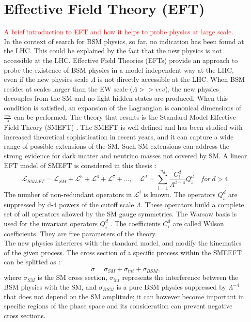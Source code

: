 \section{Effective Field Theory (EFT)}
\label{chap1:EFT}
\textcolor{red}{A brief introduction to EFT and how it helps to probe physics at large scale.\\}
In the context of search for BSM physics, so far, no indication has been found at the LHC. This could be explained by the fact that the new physics is not accessible at the LHC. Effective Field Theories (EFTs) provide an approach to probe the existence of BSM physics in a model independent way at the LHC, even if the new physics scale $\Lambda$ is not directly accessible at the LHC. When BSM resides at scales larger than the EW scale ($\Lambda >> vev$), the new physics decouples from the SM and no light hidden states are produced. When this condition is satisfied, an expansion of the Lagrangian is canonical dimensions of $\frac{vev}{\lambda}$ can be performed. The theory that results is the Standard Model Effective Field Theory (SMEFT) \cite{SMEFT_EFT}. The SMEFT is well defined and has been studied with increased theoretical sophistication in recent years, and it can capture a wide range of possible extensions of the SM. Such SM extensions can address the strong evidence for dark matter and neutrino masses not covered by SM. A linear EFT model of SMEFT is considered in this thesis : 
\begin{equation}
    \mathcal{L}_{S M E F T}=\mathcal{L}_{S M}+\mathcal{L}^{5}+\mathcal{L}^{6}+\mathcal{L}^{7}+\ldots, \quad \mathcal{L}^{d}=\sum_{i=1}^{n_{d}} \frac{C_{i}^{d}}{\Lambda^{d-4}} Q_{i}^{d} \quad for \ d>4.
\end{equation}
The number of non-redundant operators in $\mathcal{L}^i$ is known. The operators $Q_i^d$ are suppressed by d-4 powers of the cutoff scale $\Lambda$. These operators build a complete set of all operators allowed by the SM gauge symmetries. The Warsaw basis is used for the invariant operators $Q_i^d$ \cite{Warsaw}. The coefficients $C_i^d$ are called Wilson coefficients. They are free parameters of the theory. \\
The new physics interferes with the standard model, and modify the kinematics of the given process. The cross section of a specific process within the SMEEFT can be splitted as : 
\begin{equation}
    \sigma = \sigma_{SM} + \sigma_{int} + \sigma_{BSM},
\end{equation}
where $\sigma_{SM}$ is the SM cross section, $\sigma_{int}$ represents the interference between the BSM physics with the SM, and $\sigma_{BSM}$ is a pure BSM physics suppressed by $\Lambda^{-4}$ that does not depend on the SM amplitude; it can however become important in specific regions of the phase space and its consideration can prevent negative cross sections. \\

